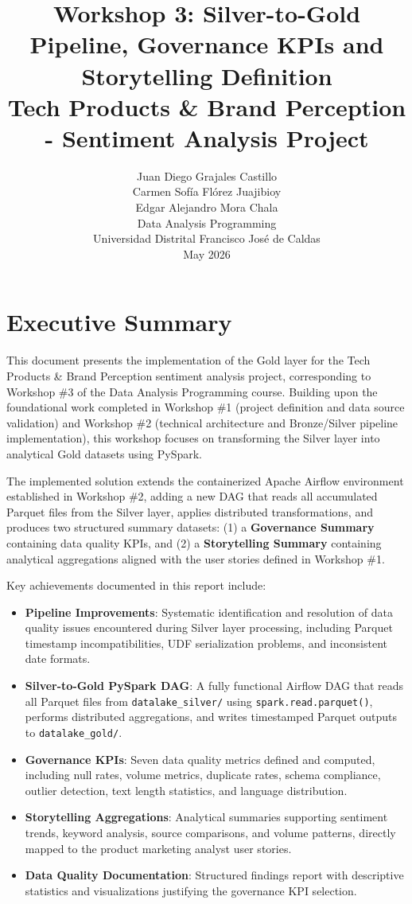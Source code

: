 \documentclass[12pt]{article}
\title{
    \vspace{1cm}
    \textbf{Workshop 3: Silver-to-Gold Pipeline, Governance KPIs and Storytelling Definition} \\
    \large{Tech Products \& Brand Perception - Sentiment Analysis Project} \\
    \vspace{0.5cm}
}
\author{
    Juan Diego Grajales Castillo \\
    Carmen Sofía Flórez Juajibioy \\
    Edgar Alejandro Mora Chala \\
    \vspace{0.3cm}
    \small{Data Analysis Programming} \\
    \small{Universidad Distrital Francisco José de Caldas} \\
    \small{May 2026}
}
\date{}
\begin{document}
\maketitle
\newpage

\tableofcontents
\newpage

\section{Executive Summary}
\label{sec:executive_summary}

This document presents the implementation of the Gold layer for the Tech Products \& Brand Perception sentiment analysis project, corresponding to Workshop \#3 of the Data Analysis Programming course. Building upon the foundational work completed in Workshop \#1 (project definition and data source validation) and Workshop \#2 (technical architecture and Bronze/Silver pipeline implementation), this workshop focuses on transforming the Silver layer into analytical Gold datasets using PySpark.

The implemented solution extends the containerized Apache Airflow environment established in Workshop \#2, adding a new DAG that reads all accumulated Parquet files from the Silver layer, applies distributed transformations, and produces two structured summary datasets: (1) a \textbf{Governance Summary} containing data quality KPIs, and (2) a \textbf{Storytelling Summary} containing analytical aggregations aligned with the user stories defined in Workshop \#1.

Key achievements documented in this report include:

\begin{itemize}
    \item \textbf{Pipeline Improvements}: Systematic identification and resolution of data quality issues encountered during Silver layer processing, including Parquet timestamp incompatibilities, UDF serialization problems, and inconsistent date formats.
    
    \item \textbf{Silver-to-Gold PySpark DAG}: A fully functional Airflow DAG that reads all Parquet files from \texttt{datalake\_silver/} using \texttt{spark.read.parquet()}, performs distributed aggregations, and writes timestamped Parquet outputs to \texttt{datalake\_gold/}.
    
    \item \textbf{Governance KPIs}: Seven data quality metrics defined and computed, including null rates, volume metrics, duplicate rates, schema compliance, outlier detection, text length statistics, and language distribution.
    
    \item \textbf{Storytelling Aggregations}: Analytical summaries supporting sentiment trends, keyword analysis, source comparisons, and volume patterns, directly mapped to the product marketing analyst user stories.
    
    \item \textbf{Data Quality Documentation}: Structured findings report with descriptive statistics and visualizations justifying the governance KPI selection.
\end{itemize}
\end{document}
